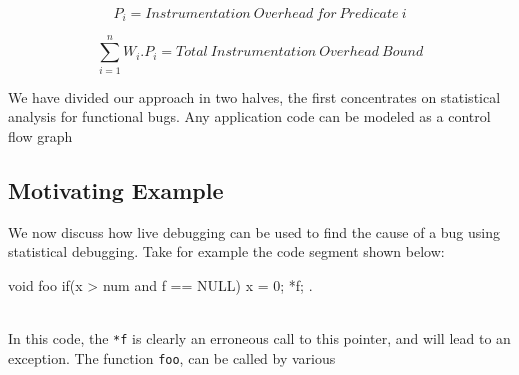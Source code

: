 \begin{equation}
P_{i} = Instrumentation\ Overhead\ for\ Predicate\ i
\end{equation}

\begin{equation}
\sum\limits_{i=1}^n W_{i}.P_{i} = Total\ Instrumentation\ Overhead\ Bound
\end{equation}

We have divided our approach in two halves, the first concentrates on statistical analysis for functional bugs.
Any application code can be modeled as a control flow graph 

\subsection{Motivating Example}
\label{sec:example}

We now discuss how live debugging can be used to find the cause of a bug using statistical debugging.
Take for example the code segment shown below:
\\
\par
\begin{verbbox}[\footnotesize]
	void foo {
		if(x > num and f == NULL){
			x = 0;
			*f;
		}.
	}
\end{verbbox}
\fbox{\theverbbox}\\

In this code, the \texttt{*f} is clearly an erroneous call to this pointer, and will lead to an exception.
The function \texttt{foo}, can be called by various 